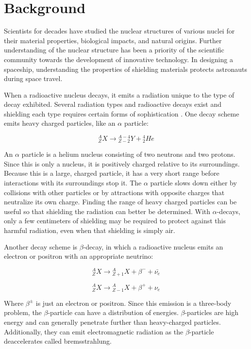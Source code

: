 \section{Background}

Scientists for decades have studied the nuclear structures of various nuclei for their material properties, biological impacts, and natural origins. Further understanding of the nuclear structure has been a priority of the scientific community towards the development of innovative technology. In designing a spaceship, understanding the properties of shielding materials protects astronauts during space travel.

When a radioactive nucleus decays, it emits a radiation unique to the type of decay exhibited. Several radiation types and radioactive decays exist and shielding each type requires certain forms of sophistication \cite{krane} \cite{lamarsh}. One decay scheme emits heavy charged particles, like an $\alpha$ particle:

\begin{equation}
{}^{A}_{Z}X \rightarrow {}^{A-4}_{Z-2}Y + {}^{4}_{2}{He}
\end{equation}

An $\alpha$ particle is a helium nucleus consisting of two neutrons and two protons. Since this is only a nucleus, it is positively charged relative to its surroundings. Because this is a large, charged particle, it has a very short range before interactions with its surroundings stop it. The $\alpha$ particle slows down either by collisions with other particles or by attractions with opposite charges that neutralize its own charge. Finding the range of heavy charged particles can be useful so that shielding the radiation can better be determined. With $\alpha$-decays, only a few centimeters of shielding may be required to protect against this harmful radiation, even when that shielding is simply air.

Another decay scheme is $\beta$-decay, in which a radioactive nucleus emits an electron or positron with an appropriate neutrino:

\begin{equation}
{}^{A}_{Z}X \rightarrow {}^{A}_{Z+1}X + \beta^{-} + \bar{\nu_{e}}
\end{equation}

\begin{equation}
{}^{A}_{Z}X \rightarrow {}^{A}_{Z-1}X + \beta^{+} + \nu_{e}
\end{equation}

Where $\beta^{\pm}$ is just an electron or positron. Since this emission is a three-body problem, the $\beta$-particle can have a distribution of energies. $\beta$-particles are high energy and can generally penetrate further than heavy-charged particles. Additionally, they can emit electromagnetic radiation as the $\beta$-particle deaccelerates called bremsstrahlung.

